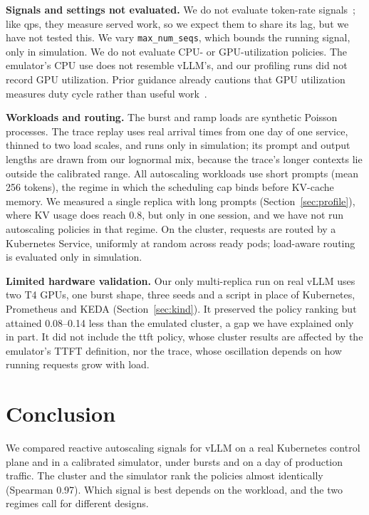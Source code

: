 \documentclass[10pt,conference]{IEEEtran}
\begin{document}
\textbf{Signals and settings not evaluated.} We do not evaluate token-rate
signals~\cite{lai2025tokenscale}; like qps, they measure served work, so we
expect them to share its lag, but we have not tested this. We vary
\texttt{max\_num\_seqs}, which bounds the running signal, only in
simulation. We do not evaluate CPU- or GPU-utilization
policies. The emulator's CPU use does not resemble vLLM's, and our profiling
runs did not record GPU utilization. Prior guidance already cautions that
GPU utilization measures duty cycle rather than useful
work~\cite{gke2026autoscaling}.

\textbf{Workloads and routing.} The burst and ramp loads are synthetic
Poisson processes. The trace replay uses real arrival times from one day of
one service, thinned to two load scales, and runs only in simulation; its
prompt and output lengths are drawn from our lognormal mix, because the
trace's longer contexts lie outside the calibrated range. All autoscaling workloads use
short prompts (mean 256 tokens), the regime in which the scheduling cap
binds before KV-cache memory. We measured a single replica with long prompts
(Section~\ref{sec:profile}), where KV usage does reach 0.8, but only in one
session, and we have not run autoscaling policies in that regime. On the cluster, requests
are routed by a Kubernetes Service, uniformly at random across ready pods;
load-aware routing is evaluated only in simulation.

\textbf{Limited hardware validation.} Our only multi-replica run on real
vLLM uses two T4 GPUs, one burst shape, three seeds and a script in place of
Kubernetes, Prometheus and KEDA (Section~\ref{sec:kind}). It preserved the
policy ranking but attained 0.08--0.14 less than the emulated cluster, a
gap we have explained only in part. It did not include the ttft policy, whose
cluster results are affected by the emulator's TTFT definition, nor the trace,
whose oscillation depends on how running requests grow with load.

\section{Conclusion}
\label{sec:conclusion}
We compared reactive autoscaling signals for vLLM on a real Kubernetes
control plane and in a calibrated simulator, under bursts and on a day of
production traffic. The cluster and the simulator rank the policies almost
identically (Spearman 0.97). Which signal is best depends on the workload,
and the two regimes call for different designs.
\end{document}
